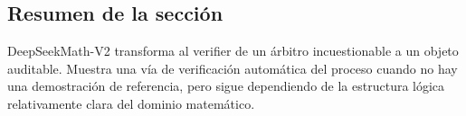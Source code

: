 \subsection{Resumen de la sección}

DeepSeekMath-V2 transforma al verifier de un árbitro incuestionable a un objeto auditable. Muestra una vía de verificación automática del proceso cuando no hay una demostración de referencia, pero sigue dependiendo de la estructura lógica relativamente clara del dominio matemático.
